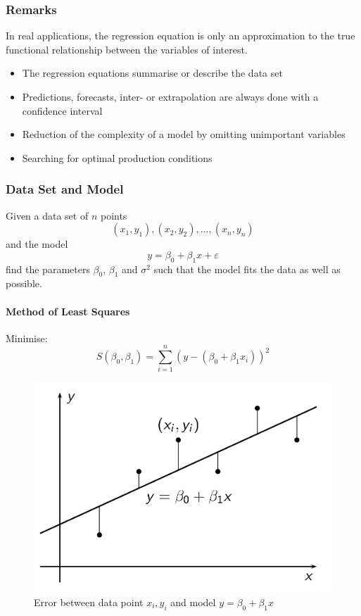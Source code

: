 \documentclass[11pt]{article}
\theoremstyle{definition}
\begin{document}
\subsubsection{Remarks}
In real applications, the regression equation is only an approximation to the true functional relationship between the variables of interest.
\begin{itemize}
	\item The regression equations summarise or describe the data set
	\item Predictions, forecasts, inter- or extrapolation are always done with a confidence interval
	\item Reduction of the complexity of a model by omitting unimportant variables
	\item Searching for optimal production conditions
\end{itemize}

\subsubsection{Data Set and Model}
Given a data set of $n$ points
\begin{equation*}
	(x_1,y_1), (x_2,y_2), \dots, (x_n,y_n)
\end{equation*}
and the model
\begin{equation*}
	y = \beta_0 + \beta_1 x + \varepsilon
\end{equation*}
find the parameters $\beta_0$, $\beta_1$ and $\sigma^2$ such that the model fits the data as well as possible.

\paragraph{Method of Least Squares} Minimise:
\begin{equation*}
	S(\beta_0, \beta_1) = \sum_{i=1}^{n} \left(y - (\beta_0 + \beta_1 x_i)\right)^2
\end{equation*}

\begin{figure}[H]
	\centering
	\includegraphics[width=0.4\linewidth]{img/least_squares_method}
	\caption{Error between data point $x_i,y_i$ and model $y =\beta_0 + \beta_1 x$}
	\label{fig:leastsquaresmethod}
\end{figure}
\end{document}

